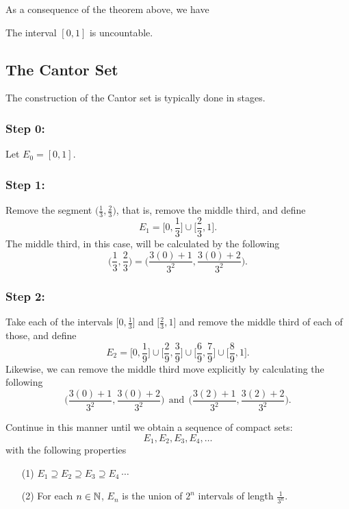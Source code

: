 \documentclass[a4paper]{report}
\begin{document}
As a consequence of the theorem above, we have

\begin{corollary}
    The interval \( [0,1]  \) is uncountable.
\end{corollary}

\subsection{The Cantor Set}

The construction of the Cantor set is typically done in stages.

\subsubsection{Step 0:}

Let \( {E}_{0} = [0,1] \).

\subsubsection{Step 1:}
Remove the segment \( \Big(  \frac{ 1 }{ 3 } , \frac{ 2 }{ 3 }  \Big)  \), that is, remove the middle third, and define
\[  {E}_{1} = \Big[ 0 , \frac{ 1 }{ 3 } \Big] \cup \Big[ \frac{ 2 }{ 3 } , 1 \Big]. \] The middle third, in this case, will be calculated by the following
\[  \Big(  \frac{ 1 }{ 3 } , \frac{ 2 }{ 3 }  \Big) = \Big(  \frac{ 3(0) + 1  }{ 3^{2} } , \frac{ 3 (0) + 2  }{ 3^{2} }  \Big). \]

\subsubsection{Step 2:}

Take each of the intervals \( \Big[0 , \frac{ 1 }{ 3 } \Big]  \) and \( \Big[ \frac{ 2 }{ 3 } , 1 \Big] \) and remove the middle third of each of those, and define 
\[  {E}_{2} = \Big[ 0 , \frac{ 1 }{ 9 } \Big] \cup \Big[ \frac{ 2 }{ 9 }, \frac{ 3 }{ 9 } \Big] \cup \Big[ \frac{ 6 }{ 9 } , \frac{ 7 }{ 9 } \Big] \cup \Big[ \frac{ 8 }{ 9 }  , 1 \Big].  \]
Likewise, we can remove the middle third move explicitly by calculating the following
\[  \Big(  \frac{ 3(0) + 1  }{ 3^{2} } , \frac{ 3(0) + 2  }{ 3^{2} }  \Big) \ \ \text{and} \ \ \Big(  \frac{ 3(2) + 1  }{ 3^{2} } , \frac{ 3(2) + 2  }{ 3^{2} }  \Big). \]

Continue in this manner until we obtain a sequence of compact sets:
\[ {E}_{1}, {E}_{2}, {E}_{3}, {E}_{4}, \dots \]
with the following properties
\begin{enumerate}
    \item[(1)] \( {E}_{1} \supseteq {E}_{2} \supseteq {E}_{3} \supseteq {E}_{4} \ \cdots  \)
    \item[(2)] For each \( n \in \mathbb{N}  \), \( {E}_{n} \) is the union of \( 2^{n} \) intervals of length \( \frac{ 1 }{ 3^{n} }  \).
\end{enumerate}
\end{document}
